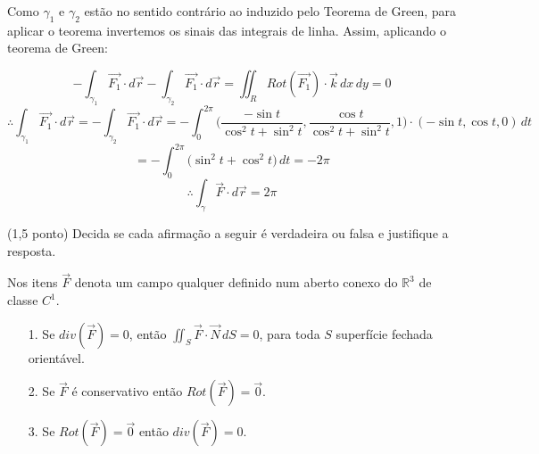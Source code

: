 \documentclass[12pt,a4paper]{article}
\begin{document}
Como $\gamma_1$ e $\gamma_2$ estão no sentido contrário ao induzido pelo Teorema de Green, para aplicar o teorema invertemos os sinais das integrais de linha. Assim, aplicando o teorema de Green:

$$ - \int_{\gamma_1} \vec{F_1} \cdot d\vec{r} - \int_{\gamma_2} \vec{F_1} \cdot d\vec{r} = \iint_{R} Rot(\vec{F_1}) \cdot \vec{k} \,dx \,dy = 0 $$
$$ \therefore \int_{\gamma_1} \vec{F_1} \cdot d\vec{r} = - \int_{\gamma_2} \vec{F_1} \cdot d\vec{r} = - \int_{0}^{2 \pi} \Big( \frac{-\sin t}{\cos^2 t + \sin^2 t} , \frac{\cos t }{\cos^2 t + \sin^2 t} , 1 \Big) \cdot (-\sin t , \cos t, 0 ) \,dt $$
$$ = - \int_{0}^{2 \pi} \Big( \sin^2 t +  \cos^2 t \Big) \,dt = - 2\pi $$
$$ \therefore \int_{\gamma} \vec{F} \cdot d\vec{r} = 2\pi $$

\newpage

 (1,5 ponto) Decida se cada afirmação a seguir é verdadeira ou falsa e justifique a resposta.

Nos itens $\vec{F}$ denota um campo qualquer definido num aberto conexo do $\mathbb{R}^3$ de classe $C^1$.

\begin{itemize}
	\item[1.] Se $div(\vec{F}) = 0$, então $\displaystyle\iint_{S} \vec{F} \cdot \vec{N} \,dS = 0$, para toda $S$ superfície fechada orientável.
	
	\item[2.] Se $\vec{F}$ é conservativo então $Rot(\vec{F}) = \vec{0}$.
	
	\item[3.] Se $Rot(\vec{F}) = \vec{0}$ então $div(\vec{F}) = 0$.

\end{itemize}


\end{document}
